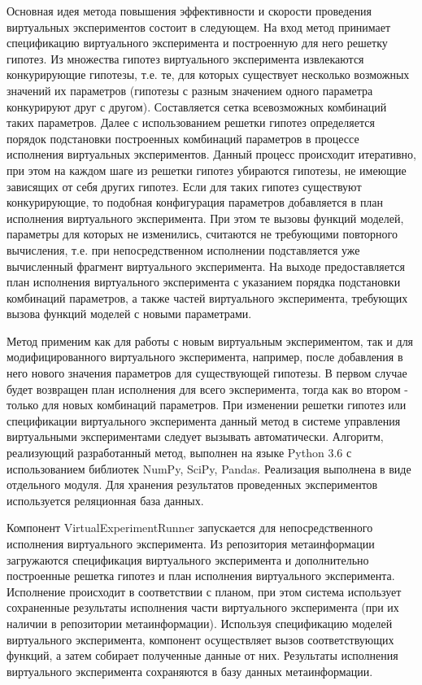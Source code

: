 Основная идея метода повышения эффективности и скорости проведения виртуальных экспериментов состоит в следующем. 
На вход метод принимает спецификацию виртуального эксперимента и построенную для него решетку гипотез. Из множества 
гипотез виртуального эксперимента извлекаются конкурирующие гипотезы, т.е. те, для которых существует несколько 
возможных значений их параметров (гипотезы с разным значением одного параметра конкурируют друг с другом). 
Составляется сетка всевозможных комбинаций таких параметров. Далее с использованием решетки гипотез определяется 
порядок подстановки построенных комбинаций параметров в процессе исполнения виртуальных экспериментов. 
Данный процесс происходит итеративно, при этом на каждом шаге из решетки гипотез убираются гипотезы, не имеющие 
зависящих от себя других гипотез. Если для таких гипотез существуют конкурирующие, то подобная конфигурация 
параметров добавляется в план исполнения виртуального эксперимента. При этом те вызовы функций моделей, параметры для 
которых не изменились, считаются не требующими повторного вычисления, т.е. при непосредственном исполнении 
подставляется уже вычисленный фрагмент виртуального эксперимента. На выходе предоставляется план исполнения 
виртуального эксперимента с указанием порядка подстановки комбинаций параметров, а также частей виртуального 
эксперимента, требующих вызова функций моделей с новыми параметрами.

Метод применим как для работы с новым виртуальным экспериментом, так и для модифицированного виртуального 
эксперимента, например, после добавления в него нового значения параметров для существующей гипотезы. В первом 
случае будет возвращен план исполнения для всего эксперимента, тогда как во втором - только для новых комбинаций 
параметров. При изменении решетки гипотез или спецификации виртуального эксперимента данный метод в системе управления 
виртуальными экспериментами следует вызывать автоматически.
Алгоритм, реализующий разработанный метод, выполнен на языке Python 3.6 с использованием библиотек NumPy, SciPy, 
Pandas. Реализация выполнена в виде отдельного модуля. Для хранения результатов проведенных экспериментов используется 
реляционная база данных.


Компонент VirtualExperimentRunner запускается для непосредственного исполнения виртуального эксперимента. 
Из репозитория метаинформации загружаются спецификация виртуального эксперимента и дополнительно построенные 
решетка гипотез и план исполнения виртуального эксперимента. Исполнение происходит в соответствии с планом, при 
этом система использует сохраненные результаты исполнения части виртуального эксперимента (при их наличии в 
репозитории метаинформации). Используя спецификацию моделей виртуального эксперимента, компонент осуществляет 
вызов соответствующих функций, а затем собирает полученные данные от них. Результаты исполнения виртуального 
эксперимента сохраняются в базу данных метаинформации.

